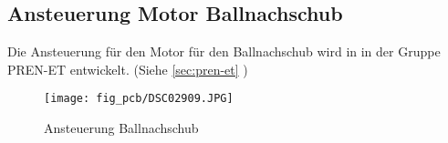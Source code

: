 \subsection{Ansteuerung Motor Ballnachschub}
\label{sec:dc}
Die Ansteuerung für den Motor für den Ballnachschub wird in in der Gruppe 
PREN-ET entwickelt. (Siehe \ref{sec:pren-et} )
\begin{figure}[h!]
    \centering
    \texttt{[image: fig\_pcb/DSC02909.JPG]}
    \caption{Ansteuerung Ballnachschub}
    \label{fig:dc}
\end{figure}
